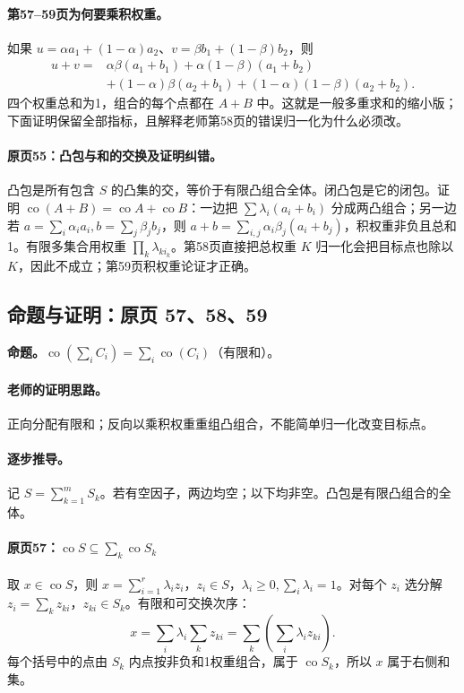 \paragraph{第57--59页为何要乘积权重。}
如果 $u=\alpha a_1+(1-\alpha)a_2$、$v=\beta b_1+(1-\beta)b_2$，则
\begin{align*}
u+v={}&\alpha\beta(a_1+b_1)+\alpha(1-\beta)(a_1+b_2)\\
&+(1-\alpha)\beta(a_2+b_1)+(1-\alpha)(1-\beta)(a_2+b_2).
\end{align*}
四个权重总和为1，组合的每个点都在 $A+B$ 中。这就是一般多重求和的缩小版；下面证明保留全部指标，且解释老师第58页的错误归一化为什么必须改。


\paragraph{原页55：凸包与和的交换及证明纠错。}凸包是所有包含 $S$ 的凸集的交，等价于有限凸组合全体。闭凸包是它的闭包。证明 $\operatorname{co}(A+B)=\operatorname{co}A+\operatorname{co}B$：一边把 $\sum\lambda_i(a_i+b_i)$ 分成两凸组合；另一边若 $a=\sum_i\alpha_i a_i,b=\sum_j\beta_j b_j$，则 $a+b=\sum_{i,j}\alpha_i\beta_j(a_i+b_j)$，积权重非负且总和1。有限多集合用权重 $\prod_k\lambda_{ki_k}$。第58页直接把总权重 $K$ 归一化会把目标点也除以 $K$，因此不成立；第59页积权重论证才正确。



\subsection{命题与证明：原页 57、58、59}

\textbf{命题。}$\operatorname{co}(\sum_i C_i)=\sum_i\operatorname{co}(C_i)$（有限和）。

\paragraph{老师的证明思路。}正向分配有限和；反向以乘积权重重组凸组合，不能简单归一化改变目标点。

\paragraph{逐步推导。}
记 $S=\sum_{k=1}^m S_k$。若有空因子，两边均空；以下均非空。凸包是有限凸组合的全体。
\paragraph{原页57：$\operatorname{co}S\subseteq\sum_k\operatorname{co}S_k$}
取 $x\in\operatorname{co}S$，则 $x=\sum_{i=1}^r\lambda_i z_i$，$z_i\in S$，$\lambda_i\ge0,\sum_i\lambda_i=1$。对每个 $z_i$ 选分解 $z_i=\sum_kz_{ki}$，$z_{ki}\in S_k$。有限和可交换次序：
\[x=\sum_i\lambda_i\sum_kz_{ki}=\sum_k\left(\sum_i\lambda_i z_{ki}\right).\]
每个括号中的点由 $S_k$ 内点按非负和1权重组合，属于 $\operatorname{co}S_k$，所以 $x$ 属于右侧和集。
